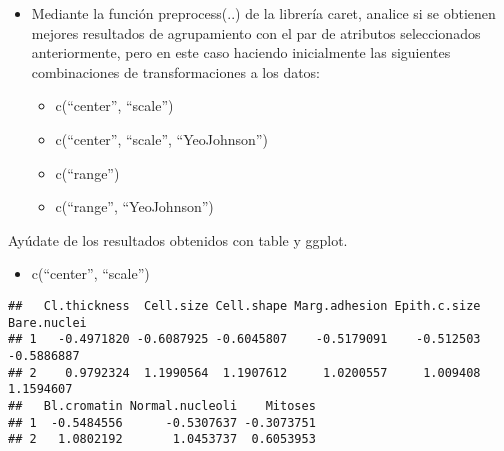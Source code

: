 \documentclass[]{article}
\newenvironment{Shaded}{\begin{snugshade}}{\end{snugshade}}
\newcommand{\CommentTok}[1]{\textcolor[rgb]{0.56,0.35,0.01}{\textit{#1}}}
\newcommand{\DataTypeTok}[1]{\textcolor[rgb]{0.13,0.29,0.53}{#1}}
\newcommand{\DecValTok}[1]{\textcolor[rgb]{0.00,0.00,0.81}{#1}}
\newcommand{\KeywordTok}[1]{\textcolor[rgb]{0.13,0.29,0.53}{\textbf{#1}}}
\newcommand{\NormalTok}[1]{#1}
\newcommand{\OperatorTok}[1]{\textcolor[rgb]{0.81,0.36,0.00}{\textbf{#1}}}
\newcommand{\StringTok}[1]{\textcolor[rgb]{0.31,0.60,0.02}{#1}}
\providecommand{\tightlist}{%
  \setlength{\itemsep}{0pt}\setlength{\parskip}{0pt}}
\begin{document}
\begin{itemize}
\item
  Mediante la función preprocess(..) de la librería caret, analice si se
  obtienen mejores resultados de agrupamiento con el par de atributos
  seleccionados anteriormente, pero en este caso haciendo inicialmente
  las siguientes combinaciones de transformaciones a los datos:

  \begin{itemize}
  \tightlist
  \item
    c(``center'', ``scale'')
  \item
    c(``center'', ``scale'', ``YeoJohnson'')
  \item
    c(``range'')
  \item
    c(``range'', ``YeoJohnson'')
  \end{itemize}
\end{itemize}

Ayúdate de los resultados obtenidos con table y ggplot.

\begin{itemize}
\tightlist
\item
  c(``center'', ``scale'')
\end{itemize}

\begin{Shaded}
\end{Shaded}

\begin{verbatim}
##   Cl.thickness  Cell.size Cell.shape Marg.adhesion Epith.c.size Bare.nuclei
## 1   -0.4971820 -0.6087925 -0.6045807    -0.5179091    -0.512503  -0.5886887
## 2    0.9792324  1.1990564  1.1907612     1.0200557     1.009408   1.1594607
##   Bl.cromatin Normal.nucleoli    Mitoses
## 1  -0.5484556      -0.5307637 -0.3073751
## 2   1.0802192       1.0453737  0.6053953
\end{verbatim}
\end{document}
